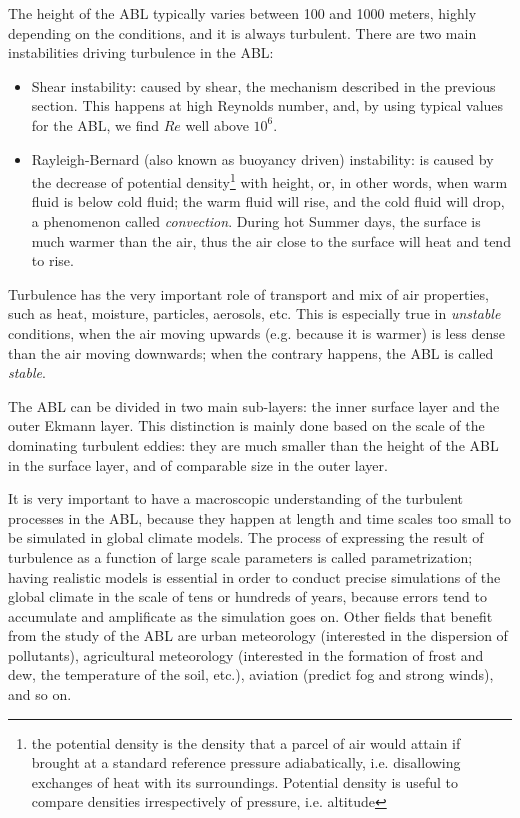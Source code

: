 \documentclass[a4paper,11pt]{kth-mag}
\begin{document}
The height of the ABL typically varies between 100 and 1000 meters, highly depending on the conditions, and it is always turbulent. There are two main instabilities driving turbulence in the ABL:

\begin{itemize}
\item Shear instability: caused by shear, the mechanism described in the previous section. This happens at high Reynolds number, and, by using typical values for the ABL, we find $Re$ well above $10^6$.
\item Rayleigh-Bernard (also known as buoyancy driven) instability: is caused by the decrease of potential density\footnote{the potential density is the density that a parcel of air would attain if brought at a standard reference pressure adiabatically, i.e. disallowing exchanges of heat with its surroundings. Potential density is useful to compare densities irrespectively of pressure, i.e. altitude} with height, or, in other words, when warm fluid is below cold fluid; the warm fluid will rise, and the cold fluid will drop, a phenomenon called \emph{convection}. During hot Summer days, the surface is much warmer than the air, thus the air close to the surface will heat and tend to rise.
\end{itemize}

Turbulence has the very important role of transport and mix of air properties, such as heat, moisture, particles, aerosols, etc. This is especially true in \emph{unstable} conditions, when the air moving upwards (e.g. because it is warmer) is less dense than the air moving downwards; when the contrary happens, the ABL is called \emph{stable}.

The ABL can be divided in two main sub-layers: the inner surface layer and the outer Ekmann layer. This distinction is mainly done based on the scale of the dominating turbulent eddies: they are much smaller than the height of the ABL in the surface layer, and of comparable size in the outer layer.

It is very important to have a macroscopic understanding of the turbulent processes in the ABL, because they happen at length and time scales too small to be simulated in global climate models. The process of expressing the result of turbulence as a function of large scale parameters is called parametrization; having realistic models is essential in order to conduct precise simulations of the global climate in the scale of tens or hundreds of years, because errors tend to accumulate and amplificate as the simulation goes on. Other fields that benefit from the study of the ABL are urban meteorology (interested in the dispersion of pollutants), agricultural meteorology (interested in the formation of frost and dew, the temperature of the soil, etc.), aviation (predict fog and strong winds), and so on.
\end{document}
